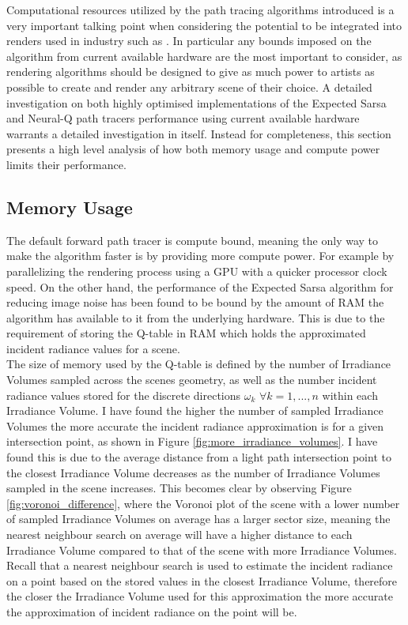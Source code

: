 \documentclass[../dissertation.tex]{subfiles}
\begin{document}
Computational resources utilized by the path tracing algorithms introduced is a very important talking point when considering the potential to be integrated into renders used in industry such as \cite{georgiev2018arnold, christensen2018renderman, hyperion}. In particular any bounds imposed on the algorithm from current available hardware are the most important to consider, as rendering algorithms should be designed to give as much power to artists as possible to create and render any arbitrary scene of their choice. A detailed investigation on both highly optimised implementations of the Expected Sarsa and Neural-Q path tracers performance using current available hardware warrants a detailed investigation in itself. Instead for completeness, this section presents a high level analysis of how both memory usage and compute power limits their performance.

\subsection{Memory Usage}

The default forward path tracer is compute bound, meaning the only way to make the algorithm faster is by providing more compute power. For example by parallelizing the rendering process using a GPU with a quicker processor clock speed. On the other hand, the performance of the Expected Sarsa algorithm for reducing image noise has been found to be bound by the amount of RAM the algorithm has available to it from the  underlying hardware. This is due to the requirement of storing the Q-table in RAM which holds the approximated incident radiance values for a scene.\\

The size of memory used by the Q-table is defined by the number of Irradiance Volumes sampled across the scenes geometry, as well as the number incident radiance values stored for the discrete directions $\omega_k$ $\forall k = 1,...,n$  within each Irradiance Volume. I have found the higher the number of sampled Irradiance Volumes the more accurate the incident radiance approximation is for a given intersection point, as shown in Figure \ref{fig:more_irradiance_volumes}.  I have found this is due to the average distance from a light path intersection point to the closest Irradiance Volume decreases as the number of Irradiance Volumes sampled in the scene increases. This becomes clear by observing Figure \ref{fig:voronoi_difference}, where the Voronoi plot of the scene with a lower number of sampled Irradiance Volumes on average has a larger sector size, meaning the nearest neighbour search on average will have a higher distance to each Irradiance Volume compared to that of the scene with more Irradiance Volumes. Recall that a nearest neighbour search is used to estimate the incident radiance on a point based on the stored values in the closest Irradiance Volume, therefore the closer the Irradiance Volume used for this approximation the more accurate the approximation of incident radiance on the point will be.\\
\end{document}
